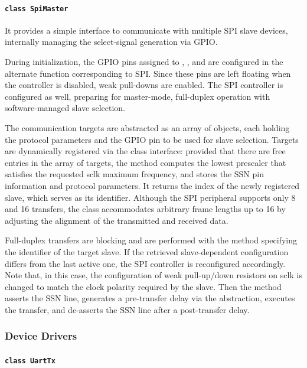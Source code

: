 \paragraph{\texttt{class SpiMaster}}

It provides a simple interface to communicate with multiple SPI slave devices, internally managing the select-signal generation via GPIO.

During initialization, the GPIO pins assigned to , , and  are configured in the alternate function corresponding to SPI. Since these pins are left floating when the controller is disabled, weak pull-downs are enabled. The SPI controller is configured as well, preparing for master-mode, full-duplex operation with software-managed slave selection.

The communication targets are abstracted as an array of  objects, each holding the protocol parameters and the GPIO pin to be used for slave selection. Targets are dynamically registered via the class interface: provided that there are free entries in the array of targets, the  method computes the lowest prescaler that satisfies the requested \ac{sclk} maximum frequency, and stores the SSN pin information and protocol parameters. It returns the index of the newly registered slave, which serves as its identifier. 
Although the \mcu SPI peripheral supports only \qty{8}{\bit} and \qty{16}{\bit} transfers, the class accommodates arbitrary frame lengths up to \qty{16}{\bit} by adjusting the alignment of the transmitted and received data.

Full-duplex transfers are blocking and are performed with the  method specifying the identifier of the target slave. If the retrieved slave-dependent configuration differs from the last active one, the SPI controller is reconfigured accordingly. Note that, in this case, the configuration of weak pull-up/down resistors on \ac{sclk} is changed to match the clock polarity required by the slave. 
Then the method asserts the SSN line, generates a pre-transfer delay via the  abstraction, executes the transfer, and de-asserts the SSN line after a post-transfer delay. 

\subsubsection{Device Drivers}\label{ssubsec:cdev}

\paragraph{\texttt{class UartTx}}


